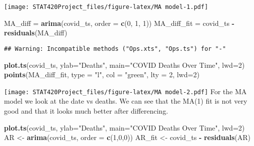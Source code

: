 \documentclass[]{article}
\newenvironment{Shaded}{\begin{snugshade}}{\end{snugshade}}
\newcommand{\DataTypeTok}[1]{\textcolor[rgb]{0.13,0.29,0.53}{#1}}
\newcommand{\DecValTok}[1]{\textcolor[rgb]{0.00,0.00,0.81}{#1}}
\newcommand{\KeywordTok}[1]{\textcolor[rgb]{0.13,0.29,0.53}{\textbf{#1}}}
\newcommand{\NormalTok}[1]{#1}
\newcommand{\OperatorTok}[1]{\textcolor[rgb]{0.81,0.36,0.00}{\textbf{#1}}}
\newcommand{\StringTok}[1]{\textcolor[rgb]{0.31,0.60,0.02}{#1}}
\begin{document}
\texttt{[image: STAT420Project\_files/figure-latex/MA model-1.pdf]}

\begin{Shaded}
\begin{Highlighting}[]
\NormalTok{MA_diff =}\StringTok{ }\KeywordTok{arima}\NormalTok{(covid_ts, }\DataTypeTok{order =} \KeywordTok{c}\NormalTok{(}\DecValTok{0}\NormalTok{, }\DecValTok{1}\NormalTok{, }\DecValTok{1}\NormalTok{))}
\NormalTok{MA_diff_fit =}\StringTok{ }\NormalTok{covid_ts }\OperatorTok{-}\StringTok{ }\KeywordTok{residuals}\NormalTok{(MA_diff)}
\end{Highlighting}
\end{Shaded}

\begin{verbatim}
## Warning: Incompatible methods ("Ops.xts", "Ops.ts") for "-"
\end{verbatim}

\begin{Shaded}
\begin{Highlighting}[]
\KeywordTok{plot.ts}\NormalTok{(covid_ts, }\DataTypeTok{ylab=}\StringTok{"Deaths"}\NormalTok{, }\DataTypeTok{main=}\StringTok{"COVID Deaths Over Time"}\NormalTok{, }\DataTypeTok{lwd=}\DecValTok{2}\NormalTok{)}
\KeywordTok{points}\NormalTok{(MA_diff_fit, }\DataTypeTok{type =} \StringTok{"l"}\NormalTok{, }\DataTypeTok{col =} \StringTok{"green"}\NormalTok{, }\DataTypeTok{lty =} \DecValTok{2}\NormalTok{, }\DataTypeTok{lwd=}\DecValTok{2}\NormalTok{)}
\end{Highlighting}
\end{Shaded}

\texttt{[image: STAT420Project\_files/figure-latex/MA model-2.pdf]} For
the MA model we look at the date vs deaths. We can see that the MA(1)
fit is not very good and that it looks much better after differencing.

\begin{Shaded}
\begin{Highlighting}[]
\KeywordTok{plot.ts}\NormalTok{(covid_ts, }\DataTypeTok{ylab=}\StringTok{"Deaths"}\NormalTok{, }\DataTypeTok{main=}\StringTok{"COVID Deaths Over Time"}\NormalTok{, }\DataTypeTok{lwd=}\DecValTok{2}\NormalTok{)}
\NormalTok{AR <-}\StringTok{ }\KeywordTok{arima}\NormalTok{(covid_ts, }\DataTypeTok{order =} \KeywordTok{c}\NormalTok{(}\DecValTok{1}\NormalTok{,}\DecValTok{0}\NormalTok{,}\DecValTok{0}\NormalTok{))}
\NormalTok{AR_fit <-}\StringTok{ }\NormalTok{covid_ts }\OperatorTok{-}\StringTok{ }\KeywordTok{residuals}\NormalTok{(AR)}
\end{Highlighting}
\end{Shaded}
\end{document}

